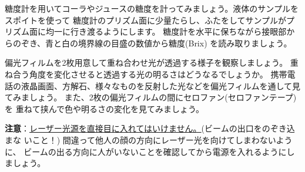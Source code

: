 \bigskip


\newpage


糖度計を用いてコーラやジュースの糖度を計ってみましょう。液体のサンプルをスポイトを使って
糖度計のプリズム面に少量たらし、ふたをしてサンプルがプリズム面に均一に行き渡るようにします。
糖度計を水平に保ちながら接眼部からのぞき、青と白の境界線の目盛の数値から糖度(Brix)
を読み取りましょう。

\bigskip



偏光フィルムを2枚用意して重ね合わせ光が透過する様子を観察しましょう。
重ね合う角度を変化させると透過する光の明るさはどうなるでしょうか。
携帯電話の液晶画面、方解石、様々なものを反射した光などを偏光フィルムを通して見てみましょう。
また、2枚の偏光フィルムの間にセロファン(セロファンテープ)を
重ねて挟んで色や明るさの変化を見てみましょう。

\bigskip



\hspace*{-\parindent}
{\bf 注意}：\underline{レーザー光源を直接目に入れてはいけません。}(ビームの出口をのぞき込まな 
いこと！) 間違って他人の顔の方向にレーザー光を向けてしまわないように、
ビームの出る方向に人がいないことを確認してから電源を入れるようにしましょう。


